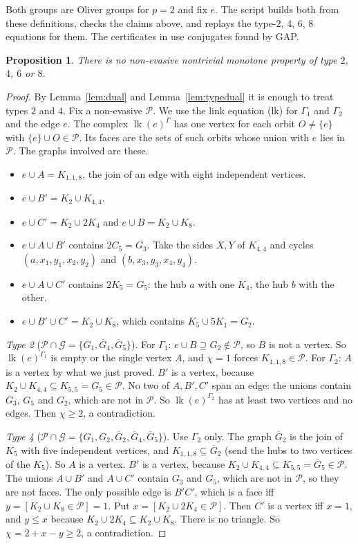 \documentclass[11pt]{article}
\theoremstyle{plain}
\newtheorem{proposition}[theorem]{Proposition}
\theoremstyle{definition}
\theoremstyle{remark}
\newcommand{\PP}{\mathcal P}
\newcommand{\lk}{\operatorname{lk}}
\newcommand{\file}[1]{\path{#1}}
\begin{document}
Both groups are Oliver groups for $p=2$ and fix $e$.
The script \file{note/check_explicit.py} builds both from these definitions, checks the claims above, and replays the type-2, 4, 6, 8 equations for them.
The certificates in \file{certs/} use conjugates found by GAP.

\begin{proposition}\label{prop:t24}
There is no non-evasive nontrivial monotone property of type $2$, $4$, $6$ or $8$.
\end{proposition}

\begin{proof}
By Lemma~\ref{lem:dual} and Lemma~\ref{lem:typedual} it is enough to treat types $2$ and $4$.
Fix a non-evasive $\PP$.
We use the link equation (lk) for $\Gamma_1$ and $\Gamma_2$ and the edge $e$.
The complex $\lk(e)^{\Gamma}$ has one vertex for each orbit $O\ne\{e\}$ with $\{e\}\cup O\in\PP$.
Its faces are the sets of such orbits whose union with $e$ lies in $\PP$.
The graphs involved are these.
\begin{itemize}[nosep]
\item $e\cup A=K_{1,1,8}$, the join of an edge with eight independent vertices.
\item $e\cup B'=K_2\cup K_{4,4}$.
\item $e\cup C'=K_2\cup2K_4$ and $e\cup B=K_2\cup K_8$.
\item $e\cup A\cup B'$ contains $2C_5=G_3$.
Take the sides $X,Y$ of $K_{4,4}$ and cycles $(a,x_1,y_1,x_2,y_2)$ and $(b,x_3,y_3,x_4,y_4)$.
\item $e\cup A\cup C'$ contains $2K_5=G_5$: the hub $a$ with one $K_4$, the hub $b$ with the other.
\item $e\cup B'\cup C'=K_2\cup K_8$, which contains $K_5\cup5K_1=G_2$.
\end{itemize}

\emph{Type 2} ($\PP\cap\mathcal G=\{G_1,\overline G_4,\overline G_5\}$).
For $\Gamma_1$: $e\cup B\supseteq G_2\notin\PP$, so $B$ is not a vertex.
So $\lk(e)^{\Gamma_1}$ is empty or the single vertex $A$, and $\chi=1$ forces $K_{1,1,8}\in\PP$.
For $\Gamma_2$: $A$ is a vertex by what we just proved.
$B'$ is a vertex, because $K_2\cup K_{4,4}\subseteq K_{5,5}=\overline G_5\in\PP$.
No two of $A,B',C'$ span an edge: the unions contain $G_3$, $G_5$ and $G_2$, which are not in $\PP$.
So $\lk(e)^{\Gamma_2}$ has at least two vertices and no edges.
Then $\chi\ge2$, a contradiction.

\emph{Type 4} ($\PP\cap\mathcal G=\{G_1,G_2,\overline G_2,\overline G_4,\overline G_5\}$).
Use $\Gamma_2$ only.
The graph $\overline G_2$ is the join of $K_5$ with five independent vertices, and $K_{1,1,8}\subseteq\overline G_2$ (send the hubs to two vertices of the $K_5$).
So $A$ is a vertex.
$B'$ is a vertex, because $K_2\cup K_{4,4}\subseteq K_{5,5}=\overline G_5\in\PP$.
The unions $A\cup B'$ and $A\cup C'$ contain $G_3$ and $G_5$, which are not in $\PP$, so they are not faces.
The only possible edge is $B'C'$, which is a face iff $y=[K_2\cup K_8\in\PP]=1$.
Put $x=[K_2\cup2K_4\in\PP]$.
Then $C'$ is a vertex iff $x=1$, and $y\le x$ because $K_2\cup2K_4\subseteq K_2\cup K_8$.
There is no triangle.
So $\chi=2+x-y\ge2$, a contradiction.
\end{proof}
\end{document}
